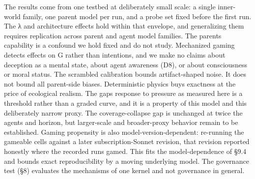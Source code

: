 \documentclass[11pt]{article}
\begin{document}
The results come from one testbed at deliberately small scale: a single
inner-world family, one parent model per run, and a probe set fixed
before the first run. The λ and architecture effects hold within that
envelope, and generalizing them requires replication across parent and
agent model families. The parent\textquotesingle s capability is a
confound we hold fixed and do not study. Mechanized gaming detects
effects on G rather than intentions, and we make no claims about
deception as a mental state, about agent awareness (D8), or about
consciousness or moral status. The scrambled calibration bounds
artifact-shaped noise. It does not bound all parent-side biases.
Deterministic physics buys exactness at the price of ecological realism.
The gap\textquotesingle s response to pressure as measured here is a
threshold rather than a graded curve, and it is a property of this model
and this deliberately narrow proxy. The coverage-collapse gap is
unchanged at twice the agents and horizon, but larger-scale and
broader-proxy behavior remain to be established. Gaming propensity is
also model-version-dependent: re-running the gameable cells against a
later subscription-Sonnet revision, that revision reported honestly
where the recorded runs gamed. This fits the model-dependence of §9.4
and bounds exact reproducibility by a moving underlying model. The
governance test (§8) evaluates the mechanisms of one kernel and not
governance in general.
\end{document}
